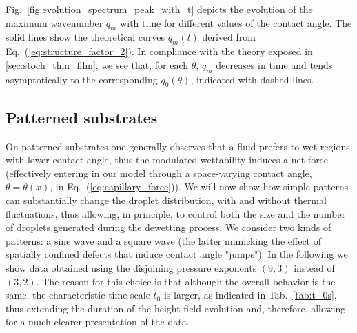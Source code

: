Fig.~\ref{fig:evolution_spectrum_peak_with_t} depicts the evolution of the maximum wavenumber $q_m$ with time for different values of the contact angle.
The solid lines show the theoretical curves $q_m(t)$ derived from Eq.~(\ref{eq:structure_factor_2}).
In compliance with the theory exposed in \ref{sec:stoch_thin_film}, we see that, for each $\theta$, $q_m$ decreases in time and tends asymptotically to the corresponding $q_0(\theta)$, 
indicated with dashed lines.

\subsection{Patterned substrates}\label{subsec:patterned_substrates}
On patterned substrates one generally observes that a fluid prefers to wet regions with lower contact angle,
thus the modulated wettability induces a net force (effectively entering in our model through a space-varying contact angle, $\theta=\theta(x)$, 
in Eq.~(\ref{eq:capillary_force})).
We will now show how simple patterns can substantially change the droplet distribution, with and without thermal fluctuations, thus allowing, in principle, to control both the size and the number of droplets generated during the dewetting process.
We consider two kinds of patterns: a sine wave and a square wave (the latter mimicking the effect of spatially confined defects that 
induce contact angle "jumps").
In the following we show data obtained using the disjoining pressure exponents $(9,3)$ instead of $(3,2)$.
The reason for this choice is that although the overall behavior is the same, the characteristic time scale $t_0$ is larger, as indicated in Tab.~\ref{tab:t_0s},
thus extending the duration of the height field evolution and, therefore, allowing for a much clearer presentation of the data.


